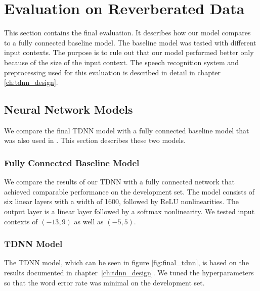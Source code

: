 
\chapter{Evaluation on Reverberated Data}
\label{ch:results}
This section contains the final evaluation. It describes how our model compares to a fully connected baseline model. The baseline model was tested with different input contexts. The purpose is to rule out that our model performed better only because of the size of the input context. The speech recognition system and preprocessing used for this evaluation is described in detail in chapter \ref{ch:tdnn_design}.
\section{Neural Network Models}
We compare the final TDNN model with a fully connected baseline model that was also used in \cite{nguyen20162016}. This section describes these two models. 
\subsection{Fully Connected Baseline Model}
We compare the results of our TDNN with a fully connected network that achieved comparable performance on the development set. The model consists of six linear layers with a width of 1600, followed by ReLU nonlinearities. The output layer is a linear layer followed by a softmax nonlinearity. We tested input contexts of $(-13, 9)$ as well as $(-5, 5)$.
\subsection{TDNN Model}
The TDNN model, which can be seen in figure \ref{fig:final_tdnn}, is based on the results documented in chapter~\ref{ch:tdnn_design}. We tuned the hyperparameters so that the word error rate was minimal on the development set. \\ 


